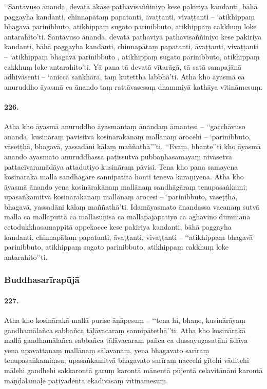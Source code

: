 ‘‘Santāvuso ānanda, devatā ākāse pathavīsaññiniyo kese pakiriya kandanti, bāhā paggayha kandanti, chinnapātaṃ papatanti, āvaṭṭanti, vivaṭṭanti – ‘atikhippaṃ bhagavā parinibbuto, atikhippaṃ sugato parinibbuto, atikhippaṃ cakkhuṃ loke antarahito’ti. Santāvuso ānanda, devatā pathaviyā pathavīsaññiniyo kese pakiriya kandanti, bāhā paggayha kandanti, chinnapātaṃ papatanti, āvaṭṭanti, vivaṭṭanti – ‘atikhippaṃ bhagavā parinibbuto , atikhippaṃ sugato parinibbuto, atikhippaṃ cakkhuṃ loke antarahito’ti. Yā pana tā devatā vītarāgā, tā satā sampajānā adhivāsenti – ‘aniccā saṅkhārā, taṃ kutettha labbhā’ti. Atha kho āyasmā ca anuruddho āyasmā ca ānando taṃ rattāvasesaṃ dhammiyā kathāya vītināmesuṃ.

\paragraph{226.} Atha kho āyasmā anuruddho āyasmantaṃ ānandaṃ āmantesi – ‘‘gacchāvuso ānanda, kusināraṃ pavisitvā kosinārakānaṃ mallānaṃ ārocehi – ‘parinibbuto, vāseṭṭhā, bhagavā, yassadāni kālaṃ maññathā’’’ti. ‘‘Evaṃ, bhante’’ti kho āyasmā ānando āyasmato anuruddhassa paṭissutvā pubbaṇhasamayaṃ nivāsetvā pattacīvaramādāya attadutiyo kusināraṃ pāvisi. Tena kho pana samayena kosinārakā mallā sandhāgāre sannipatitā honti teneva karaṇīyena. Atha kho āyasmā ānando yena kosinārakānaṃ mallānaṃ sandhāgāraṃ tenupasaṅkami; upasaṅkamitvā kosinārakānaṃ mallānaṃ ārocesi – ‘parinibbuto, vāseṭṭhā, bhagavā, yassadāni kālaṃ maññathā’ti. Idamāyasmato ānandassa vacanaṃ sutvā mallā ca mallaputtā ca mallasuṇisā ca mallapajāpatiyo ca aghāvino dummanā cetodukkhasamappitā appekacce kese pakiriya kandanti, bāhā paggayha kandanti, chinnapātaṃ papatanti, āvaṭṭanti, vivaṭṭanti – ‘‘atikhippaṃ bhagavā parinibbuto, atikhippaṃ sugato parinibbuto, atikhippaṃ cakkhuṃ loke antarahito’’ti.

\subsubsection{Buddhasarīrapūjā}

\paragraph{227.} Atha kho kosinārakā mallā purise āṇāpesuṃ – ‘‘tena hi, bhaṇe, kusinārāyaṃ gandhamālañca sabbañca tāḷāvacaraṃ sannipātethā’’ti. Atha kho kosinārakā mallā gandhamālañca sabbañca tāḷāvacaraṃ pañca ca dussayugasatāni ādāya yena upavattanaṃ mallānaṃ sālavanaṃ, yena bhagavato sarīraṃ tenupasaṅkamiṃsu; upasaṅkamitvā bhagavato sarīraṃ naccehi gītehi vāditehi mālehi gandhehi sakkarontā garuṃ karontā mānentā pūjentā celavitānāni karontā maṇḍalamāḷe paṭiyādentā ekadivasaṃ vītināmesuṃ.

